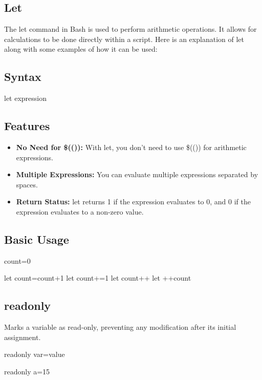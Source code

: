 \documentclass{report}
\begin{document}
    \subsection{Let}
    \bigbreak \noindent 
    The let command in Bash is used to perform arithmetic operations. It allows for calculations to be done directly within a script. Here is an explanation of let along with some examples of how it can be used:
    \bigbreak \noindent 
    \subsection{Syntax}
    \bigbreak \noindent 
    \begin{bashcode}
    let expression
    \end{bashcode}
    \bigbreak \noindent 
    \subsection{Features}
    \begin{itemize}
        \item \textbf{No Need for \$(()):} With let, you don't need to use \$(()) for arithmetic expressions.
        \item \textbf{Multiple Expressions:} You can evaluate multiple expressions separated by spaces.
        \item \textbf{Return Status:} let returns 1 if the expression evaluates to 0, and 0 if the expression evaluates to a non-zero value.
    \end{itemize}
    \bigbreak \noindent 
    \subsection{Basic Usage}
    \bigbreak \noindent 
    \begin{bashcode}
    count=0

    let count=count+1
    let count+=1
    let count++
    let ++count
    \end{bashcode}

    \bigbreak \noindent 
    \subsection{readonly}
    \bigbreak \noindent 
    Marks a variable as read-only, preventing any modification after its initial assignment.
    \bigbreak \noindent 
    \begin{bashcode}
    readonly var=value

    readonly a=15
    \end{bashcode}
\end{document}
